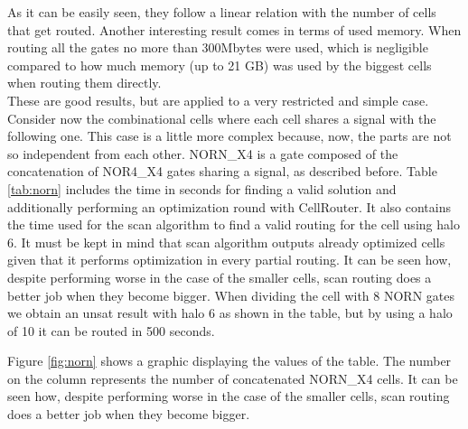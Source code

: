 As it can be easily seen, they follow a linear relation with the number of cells that get routed. Another interesting result comes in terms of used memory. When routing all the gates no more than 300Mbytes were used, which is negligible compared to how much memory (up to 21 GB) was used by the biggest cells when routing them directly.  \\

These are good results, but are applied to a very restricted and simple case. Consider now the combinational cells where each cell shares a signal with the following one. This case is a little more complex because, now, the parts are not so independent from each other. NORN\_X4 is a gate composed of the concatenation of NOR4\_X4 gates sharing a signal, as described before. Table \ref{tab:norn} includes the time in seconds for finding a valid solution and additionally performing an optimization round with CellRouter. It also contains the time used for the scan algorithm to find a valid routing for the cell using halo 6. It must be kept in mind that scan algorithm outputs already optimized cells given that it performs optimization in every partial routing. It can be seen how, despite performing worse in the case of the smaller cells, scan routing does a better job when they become bigger. When dividing the cell with 8 NORN gates we obtain an unsat result with halo 6 as shown in the table, but by using a halo of 10 it can be routed in 500 seconds. \\

\begin{table}
\centering
{}
\caption{Concatenated NORN\_X4 gates - Time (s) used}
\label{tab:norn}
\end{table}

Figure \ref{fig:norn} shows a graphic displaying the values of the table. The number on the column represents the number of concatenated NORN\_X4 cells. It can be seen how, despite performing worse in the case of the smaller cells, scan routing does a better job when they become bigger. \\

